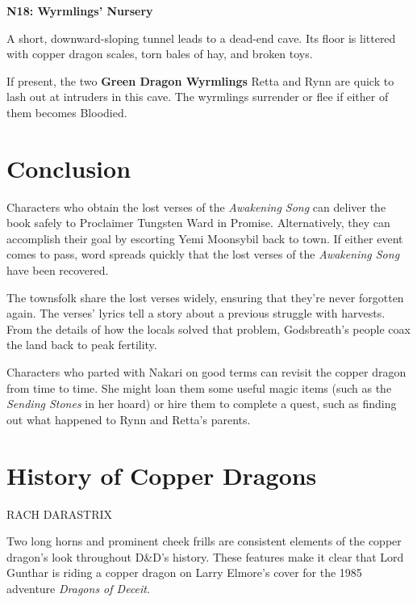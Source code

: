 \documentclass[letterpaper, 11pt, twocolumn]{dndbook}
\begin{document}
\textbf{N18: Wyrmlings' Nursery}

\begin{DndReadAloud}
A short, downward-sloping tunnel leads to a dead-end cave. Its floor is littered with copper dragon scales, torn bales of hay, and broken toys.
\end{DndReadAloud}

If present, the two \textbf{Green Dragon Wyrmlings} Retta and Rynn are quick to lash out at intruders in this cave. The wyrmlings surrender or flee if either of them becomes Bloodied.
\section{Conclusion}

Characters who obtain the lost verses of the \textit{Awakening Song} can deliver the book safely to Proclaimer Tungsten Ward in Promise. Alternatively, they can accomplish their goal by escorting Yemi Moonsybil back to town. If either event comes to pass, word spreads quickly that the lost verses of the \textit{Awakening Song} have been recovered.

The townsfolk share the lost verses widely, ensuring that they're never forgotten again. The verses' lyrics tell a story about a previous struggle with harvests. From the details of how the locals solved that problem, Godsbreath's people coax the land back to peak fertility.

Characters who parted with Nakari on good terms can revisit the copper dragon from time to time. She might loan them some useful magic items (such as the \textit{Sending Stones} in her hoard) or hire them to complete a quest, such as finding out what happened to Rynn and Retta's parents.

\section{History of Copper Dragons}

RACH DARASTRIX

\begin{DndReadAloud}
Two long horns and prominent cheek frills are consistent elements of the copper dragon's look throughout D\&D's history. These features make it clear that Lord Gunthar is riding a copper dragon on Larry Elmore's cover for the 1985 adventure \textit{Dragons of Deceit}.
\end{DndReadAloud}

\end{document}
